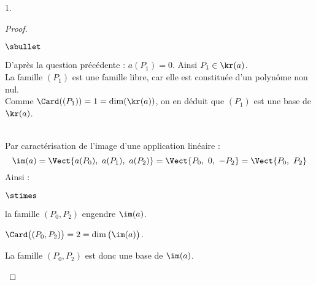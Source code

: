 \begin{noliste}{1.}
\begin{proof}
\begin{noliste}{$\sbullet$}
      \newpage


      \noindent
      D'après la question précédente : $a(P_1) = 0$. Ainsi $P_1 \in
      \kr(a)$. \\
      La famille $(P_1)$ est une famille libre, car elle est
      constituée d'un polynôme non nul.\\
      Comme $\Card( (P_1) ) = 1 = \dim(\kr(a))$, on en déduit que
      $(P_1)$ est une base de $\kr(a)$.\\[-.2cm] %
      ~\\[-.6cm]
      
    \item Par caractérisation de l'image d'une application linéaire :
      \[
      \im(a) =\Vect{a(P_0), \ a(P_1), \ a(P_2)} = \Vect{P_0, \ 0, \ -P_2}
      = \Vect{P_0, \ P_2}
      \]
      Ainsi :
      \begin{noliste}{$\stimes$}
      \item la famille $(P_0,P_2)$ engendre $\im(a)$.
      \item $\Card\big( (P_0,P_2) \big) = 2 = \dim\big( \im(a) \big)$.
      \end{noliste}
      La famille $(P_0,P_2)$ est donc une base de $\im(a)$. %
    \end{noliste}
    

\end{proof}
\end{noliste}
